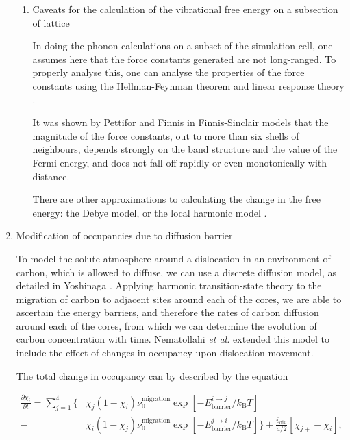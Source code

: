 \documentclass[a4paper,12pt,oneside,print,numbered,index,PageStyleIII]{PhDThesisPSnPDF}
\begin{document}
\begin{enumerate}
\begin{enumerate}
\item Caveats for the calculation of the vibrational free energy on a subsection of lattice
\label{sec:org51f98ec}

In doing the phonon calculations on a subset of the simulation cell, one
assumes here that the force constants generated are not long-ranged. To
properly analyse this, one can analyse the properties of the force constants
using the Hellman-Feynman theorem and linear response theory
\cite{Finnis2003}.

It was shown by Pettifor and Finnis \cite{Pettifor1987} in Finnis-Sinclair
models that the magnitude of the force constants, out to more than six
shells of neighbours, depends strongly on the band structure and the value
of the Fermi energy, and does not fall off rapidly or even monotonically
with distance.

There are other approximations to calculating the change in the free energy:
the Debye model, or the local harmonic model \cite{Garbulsky1996}.
\end{enumerate}


\item Modification of occupancies due to diffusion barrier
\label{sec:orgdf17c87}


To model the solute atmosphere around a dislocation in an environment of
carbon, which is allowed to diffuse, we can use a discrete diffusion model,
as detailed in Yoshinaga \cite{Yoshinaga1971}. Applying harmonic
transition-state theory to the migration of carbon to adjacent sites around each of the cores,
we are able to ascertain the energy barriers, and therefore the rates of
carbon diffusion around each of the cores, from which we can determine the
evolution of carbon concentration with time. Nematollahi \emph{et al.} \cite{Nematollahi2016} extended this model
to include the effect of changes in occupancy upon dislocation movement.

The total change in occupancy can by described by
the equation

\begin{align*}
  \frac{\partial \chi_i}{\partial t} = \sum_{j=1}^4
 \Big\{ &\chi_j (1 - \chi_i) \nu_0^{\text{migration}} \exp{\left[ -
E_{\text{barrier}}^{i\rightarrow j} / k_{\text{B}} T\right]}\\ -
       &\chi_i (1 - \chi_j) \nu_0^{\text{migration}} \exp{\left[ -
E_{\text{barrier}}^{j\rightarrow i} / k_{\text{B}} T\right]}
\Big\} + \frac{\bar{v}_{\text{disl}}}{a/2} [\chi_{j+} - \chi_{i}],\label{eq:discrete_diffusion_model}
\end{align*}


\end{enumerate}
\end{document}
